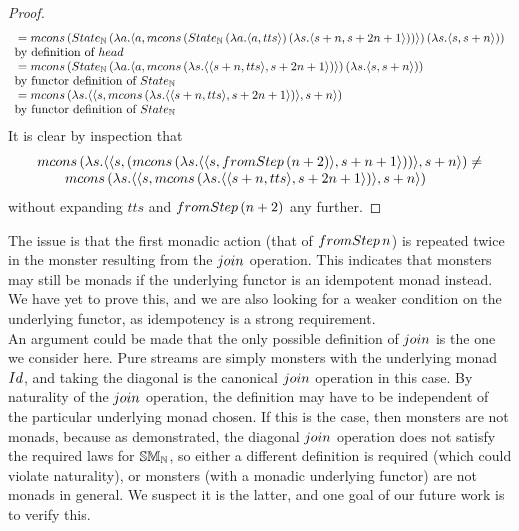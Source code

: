\begin{proof}
$$\begin{array}{ll}
{}=  \mcons\, (\state_{\nat}\,(\lambda a . \pair{a}{  
\mcons\, (\state_{\nat} \,(\lambda a . \pair{a}{tts})\, (\lambda s . \pair{s + n}{s + 2n + 1}))
})\, (\lambda s. \pair{s}{s + n}))
\\ \mbox{by definition of } \head \\
{}= \mcons\, (\state_{\nat}\,(\lambda a . \pair{a}{  
\mcons\, (\lambda s . \pair{\pair{s + n}{tts}}{s + 2n + 1})
})\, (\lambda s. \pair{s}{s + n})) \\
\mbox{by functor definition of } \state_{\nat}  \\
{}= \mcons\, (\lambda s. \pair{\pair{s}{\mcons\, (\lambda s . \pair{\pair{s + n}{tts}}{s + 2n + 1})}}{s + n}) \\ 
\mbox{by functor definition of } \state_{\nat} \\
\end{array} 
$$
It is clear by inspection that 
$$
\begin{array}{l}
\mcons\, (\lambda s. \pair{\pair{s}{(\mcons\, (\lambda s. \pair{\pair{s}{\fromstepstr\, (n + 2)}}{s + n + 1}))}}{s + n}) \neq \\
\qquad \mcons\, (\lambda s. \pair{\pair{s}{\mcons\, (\lambda s . \pair{\pair{s + n}{tts}}{s + 2n + 1})}}{s + n})
\end{array} 
$$
without expanding $tts$ and $\fromstepstr\, (n + 2)$ any further.
\end{proof}

The issue is that the first monadic action (that of $\fromstepstr\, n$) is repeated twice in the monster resulting from the $\join$ operation. 
This indicates that monsters may still be monads if the underlying functor is an idempotent monad instead. 
We have yet to prove this, and we are also looking for a weaker condition on the underlying functor, as idempotency is a strong requirement. \\

An argument could be made that the only possible definition of $\join$ is the one we consider here. Pure streams are simply monsters with the underlying monad $\Id$, and taking the diagonal is the canonical $\join$ operation in this case. By naturality of the $\join$ operation, the definition may have to be independent of the particular underlying monad chosen. If this is the case, then monsters are not monads, because as demonstrated, the diagonal $\join$ operation does not satisfy the required laws for $\mathbb{SM}_{\mathbb{N}}$, so either a different definition is required (which could violate naturality), or monsters (with a monadic underlying functor) are not monads in general. We suspect it is the latter, and one goal of our future work is to verify this.
